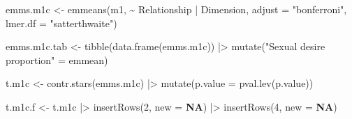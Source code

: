 \documentclass[
  bookmarksnumbered]{article}
\newenvironment{Shaded}{\begin{snugshade}}{\end{snugshade}}
\newcommand{\AttributeTok}[1]{\textcolor[rgb]{0.80,0.80,0.80}{#1}}
\newcommand{\ConstantTok}[1]{\textcolor[rgb]{0.86,0.64,0.64}{\textbf{#1}}}
\newcommand{\DecValTok}[1]{\textcolor[rgb]{0.86,0.86,0.80}{#1}}
\newcommand{\FunctionTok}[1]{\textcolor[rgb]{0.94,0.94,0.56}{#1}}
\newcommand{\NormalTok}[1]{\textcolor[rgb]{0.80,0.80,0.80}{#1}}
\newcommand{\OtherTok}[1]{\textcolor[rgb]{0.94,0.94,0.56}{#1}}
\newcommand{\SpecialCharTok}[1]{\textcolor[rgb]{0.86,0.64,0.64}{#1}}
\newcommand{\StringTok}[1]{\textcolor[rgb]{0.80,0.58,0.58}{#1}}
\begin{document}
\begin{Shaded}
\begin{Highlighting}[]
\NormalTok{emms.m1c }\OtherTok{\textless{}{-}} \FunctionTok{emmeans}\NormalTok{(m1, }\SpecialCharTok{\textasciitilde{}}\NormalTok{ Relationship }\SpecialCharTok{|}\NormalTok{ Dimension,}
                    \AttributeTok{adjust =} \StringTok{"bonferroni"}\NormalTok{,}
                    \AttributeTok{lmer.df =} \StringTok{"satterthwaite"}\NormalTok{)}

\NormalTok{emms.m1c.tab }\OtherTok{\textless{}{-}} \FunctionTok{tibble}\NormalTok{(}\FunctionTok{data.frame}\NormalTok{(emms.m1c)) }\SpecialCharTok{|\textgreater{}}
  \FunctionTok{mutate}\NormalTok{(}\StringTok{"Sexual desire proportion"} \OtherTok{=}\NormalTok{ emmean)}

\NormalTok{t.m1c }\OtherTok{\textless{}{-}} \FunctionTok{contr.stars}\NormalTok{(emms.m1c) }\SpecialCharTok{|\textgreater{}} 
  \FunctionTok{mutate}\NormalTok{(}\AttributeTok{p.value =} \FunctionTok{pval.lev}\NormalTok{(p.value))}

\NormalTok{t.m1c.f }\OtherTok{\textless{}{-}}\NormalTok{ t.m1c }\SpecialCharTok{|\textgreater{}} 
  \FunctionTok{insertRows}\NormalTok{(}\DecValTok{2}\NormalTok{, }\AttributeTok{new =} \ConstantTok{NA}\NormalTok{) }\SpecialCharTok{|\textgreater{}}
  \FunctionTok{insertRows}\NormalTok{(}\DecValTok{4}\NormalTok{, }\AttributeTok{new =} \ConstantTok{NA}\NormalTok{)}


\end{Highlighting}
\end{Shaded}
\end{document}
